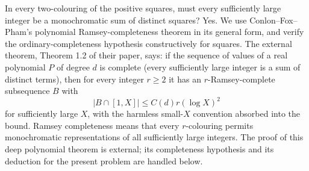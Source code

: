 In every two-colouring of the positive squares, must every sufficiently large integer be a monochromatic sum of distinct squares? Yes. We use Conlon--Fox--Pham's polynomial Ramsey-completeness theorem in its general form, and verify the ordinary-completeness hypothesis constructively for squares.
The external theorem, Theorem 1.2 of their paper, says: if the sequence of values of a real polynomial $P$ of degree $d$ is complete (every sufficiently large integer is a sum of distinct terms), then for every integer $r\ge2$ it has an $r$-Ramsey-complete subsequence $B$ with
\[
 |B\cap[1,X]|\le C(d)r(\log X)^2
\]
for sufficiently large $X$, with the harmless small-$X$ convention absorbed into the bound. Ramsey completeness means that every $r$-colouring permits monochromatic representations of all sufficiently large integers. The proof of this deep polynomial theorem is external; its completeness hypothesis and its deduction for the present problem are handled below.
